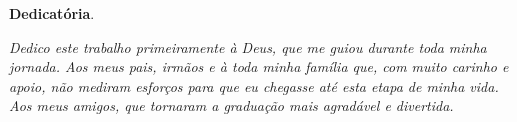 \begin{dedicatoria}
	\vspace*{\fill}
	\centering
	\noindent

	\textbf{Dedicatória}.
	
	\textit{Dedico este trabalho primeiramente à Deus, que me guiou durante toda minha jornada. Aos meus pais, irmãos e à toda minha família que, com muito carinho e apoio, não mediram esforços para que eu chegasse até esta etapa de minha vida. Aos meus amigos, que tornaram a graduação mais agradável e divertida.} 
	
	
	\vspace*{\fill}
\end{dedicatoria}

\begin{comment}




\end{comment}
